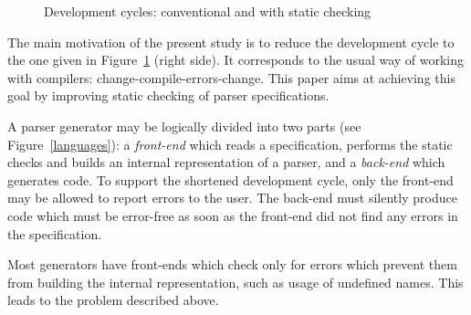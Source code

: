 \documentclass{llncs2e/llncs}
\newcommand{\figref}[1]{Figure~\ref{#1}}
\begin{document}
\begin{figure}[h!]
\centering
{}
\caption{Development cycles: conventional and with static checking}\label{cycles}
\end{figure}

The main motivation of the present study is to reduce the development cycle to the one given in \figref{cycles} (right side).
It corresponds to the usual way of working with compilers: change-compile-errors-change. This paper aims at achieving this goal by improving static checking of parser specifications.

A parser generator may be logically divided into two parts (see \figref{languages}): a \emph{front-end} which reads a specification, performs the static checks and builds an internal representation of a parser, and a \emph{back-end} which generates code. To support the shortened development cycle, only the front-end may be allowed to report errors to the user. The back-end must silently produce code which must be error-free as soon as the front-end did not find any errors in the specification. 

Most generators have front-ends which check only for errors which prevent them from building the internal representation, such as usage of undefined names. This leads to the problem described above.
\end{document}
